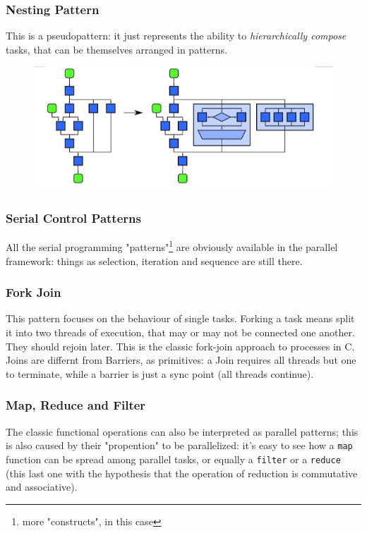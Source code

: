 \documentclass{article}
\begin{document}
			\subsubsection{Nesting Pattern}
				This is a pseudopattern: it just represents the ability to \textit{hierarchically compose} tasks, that can be themselves arranged in patterns.
				\begin{figure}[H]
					\centering
					\includegraphics[width = \textwidth]{./images/Nesting.png}
				\end{figure}

			\subsubsection{Serial Control Patterns}
				All the serial programming "patterns"\footnote{more "constructs", in this case} are obviously available in the parallel framework: things as selection, iteration and sequence are still there.

			\subsubsection{Fork Join}
				This pattern focuses on the behaviour of single tasks. Forking a task means split it into two threads of execution, that may or may not be connected one another. They should rejoin later. This is the classic fork-join approach to processes in C. Joins are differnt from Barriers, as primitives: a Join requires all threads but one to terminate, while a barrier is just a sync point (all threads continue).

			\subsubsection{Map, Reduce and Filter}
				The classic functional operations can also be interpreted as parallel patterns; this is also caused by their "propention" to be parallelized: it's easy to see how a \verb|map| function can be spread among parallel tasks, or equally a \verb|filter| or a \verb|reduce| (this last one with the hypothesis that the operation of reduction is commutative and associative).
\end{document}
